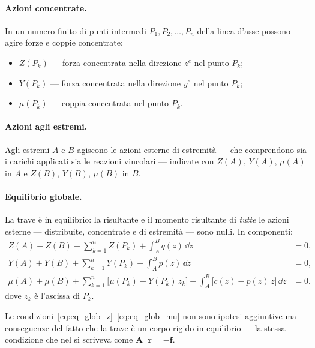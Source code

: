 \paragraph{Azioni concentrate.}
In un numero finito di punti intermedi $P_1, P_2,
\ldots, P_n$ della linea d'asse possono agire forze
e coppie concentrate:
\begin{itemize}[nosep]
	\item $Z(P_k)$ --- forza concentrata nella
	direzione $z^e$ nel punto $P_k$;
	\item $Y(P_k)$ --- forza concentrata nella
	direzione $y^e$ nel punto $P_k$;
	\item $\mu(P_k)$ --- coppia concentrata nel
	punto $P_k$.
\end{itemize}

\paragraph{Azioni agli estremi.}
Agli estremi $A$ e $B$ agiscono le azioni esterne
di estremità --- che comprendono sia i carichi
applicati sia le reazioni vincolari --- indicate
con $Z(A)$, $Y(A)$, $\mu(A)$ in $A$ e $Z(B)$,
$Y(B)$, $\mu(B)$ in $B$.






\paragraph{Equilibrio globale.}
La trave è in equilibrio: la risultante e il momento
risultante di \emph{tutte} le azioni esterne ---
distribuite, concentrate e di estremità --- sono
nulli. In componenti:
\begin{align}
	Z(A) + Z(B) + \sum_{k=1}^{n} Z(P_k)
	+ \int_A^B q(z)\,\dd z &= 0,
	\label{eq:eq_glob_z}\\
	Y(A) + Y(B) + \sum_{k=1}^{n} Y(P_k)
	+ \int_A^B p(z)\,\dd z &= 0,
	\label{eq:eq_glob_y}\\
	\mu(A) + \mu(B)
	+ \sum_{k=1}^{n}\bigl[\mu(P_k)
	- Y(P_k)\,z_k\bigr]
	+ \int_A^B \bigl[c(z)
	- p(z)\,z\bigr]\,\dd z &= 0.
	\label{eq:eq_glob_mu}
\end{align}
dove $z_k$ è l'ascissa di $P_k$.

\begin{oss}
	Le condizioni~\eqref{eq:eq_glob_z}--\eqref{eq:eq_glob_mu}
	non sono ipotesi aggiuntive ma conseguenze del
	fatto che la trave è un corpo rigido in equilibrio
	--- la stessa condizione che nel
	 si scriveva
	come $\bm{A}^{\top}\bm{r} = -\bm{f}$.
\end{oss}



